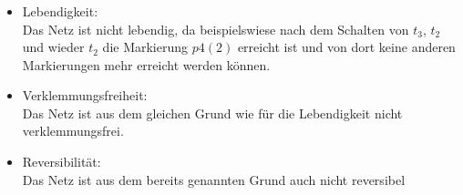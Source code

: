 \documentclass[a4paper,12pt]{scrartcl}
\begin{document}
\subsubsection{}
\begin{itemize}
	\item{Lebendigkeit:}\\
		Das Netz ist nicht lebendig, da beispielswiese nach 
    dem Schalten von $t_3$, $t_2$ und wieder $t_2$ 
		die Markierung $p4(2)$ erreicht ist und von dort
    keine anderen Markierungen 
		mehr erreicht werden können.
	\item{Verklemmungsfreiheit:}\\
		Das Netz ist aus dem gleichen Grund wie für die 
		Lebendigkeit nicht verklemmungsfrei.
	\item{Reversibilität:}\\
		Das Netz ist aus dem bereits genannten Grund auch 
		nicht reversibel

\end{itemize}
\end{document}
